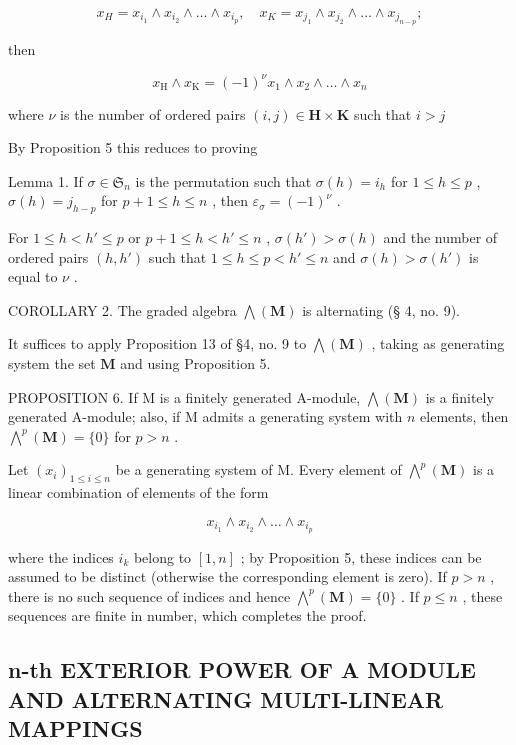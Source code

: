\[
x _ {H} = x _ {i _ {1}} \wedge x _ {i _ {2}} \wedge \dots \wedge x _ {i _ {p}}, \quad x _ {K} = x _ {j _ {1}} \wedge x _ {j _ {2}} \wedge \dots \wedge x _ {j _ {n - p}};
\]

then

\[
x _ {\mathrm{H}} \wedge x _ {\mathrm{K}} = (- 1) ^ {\nu} x _ {1} \wedge x _ {2} \wedge \dots \wedge x _ {n}\tag{7}
\]

where \(\nu\) is the number of ordered pairs \((i,j)\in \mathbf{H}\times \mathbf{K}\) such that \(i > j\)

By Proposition 5 this reduces to proving

Lemma 1. If \(\sigma \in \mathfrak{S}_n\) is the permutation such that \(\sigma(h) = i_h\) for \(1 \leqslant h \leqslant p\) , \(\sigma(h) = j_{h-p}\) for \(p + 1 \leqslant h \leqslant n\) , then \(\varepsilon_\sigma = (-1)^{\nu}\) .

For \(1 \leqslant h < h' \leqslant p\) or \(p + 1 \leqslant h < h' \leqslant n\) , \(\sigma(h') > \sigma(h)\) and the number of ordered pairs \((h, h')\) such that \(1 \leqslant h \leqslant p < h' \leqslant n\) and \(\sigma(h) > \sigma(h')\) is equal to \(\nu\) .

COROLLARY 2. The graded algebra \(\bigwedge (\mathbf{M})\) is alternating (§ 4, no. 9).

It suffices to apply Proposition 13 of §4, no. 9 to \(\bigwedge (\mathbf{M})\) , taking as generating system the set \(\mathbf{M}\) and using Proposition 5.

PROPOSITION 6. If M is a finitely generated A-module, \(\bigwedge (\mathbf{M})\) is a finitely generated A-module; also, if M admits a generating system with \(n\) elements, then \(\bigwedge^{p}(\mathbf{M}) = \{0\}\) for \(p > n\) .

Let \((x_{i})_{1\leqslant i\leqslant n}\) be a generating system of M. Every element of \(\bigwedge^{p}(\mathbf{M})\) is a linear combination of elements of the form

\[
x _ {i _ {1}} \wedge x _ {i _ {2}} \wedge \dots \wedge x _ {i _ {p}}
\]

where the indices \(i_k\) belong to \([1, n]\) ; by Proposition 5, these indices can be assumed to be distinct (otherwise the corresponding element is zero). If \(p > n\) , there is no such sequence of indices and hence \(\bigwedge^p(\mathbf{M}) = \{0\}\) . If \(p \leqslant n\) , these sequences are finite in number, which completes the proof.

\subsection{n-th EXTERIOR POWER OF A MODULE AND ALTERNATING MULTI-LINEAR MAPPINGS}

